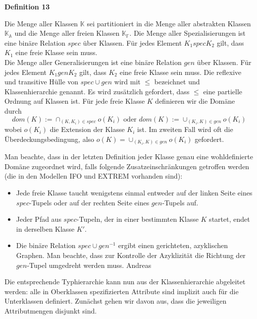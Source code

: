 \begin{itemize}
	\begin{framed}
		\textbf{Definition 13}
	\end{framed}
	
	Man beachte, dass in der letzten Definition jeder Klasse genau eine
	wohldefinierte Domäne zugeordnet wird, falls folgende
	Zusatzeinschränkungen getroffen werden (die in den Modellen IFO
	und EXTREM vorhanden sind):
	
	\begin{itemize}
		\item Jede freie Klasse taucht wenigstens einmal entweder auf der
		linken Seite eines $spec$-Tupels oder auf der rechten Seite eines
		$gen$-Tupels auf.
		\item Jeder Pfad aus $spec$-Tupeln, der in einer bestimmten Klasse $K$
		startet, endet in derselben Klasse $K'$.
		\item Die binäre Relation $spec \cup gen^{-1}$ ergibt einen gerichteten,
		azyklischen Graphen. Man beachte, dass zur Kontrolle der
		Azyklizität die Richtung der $gen$-Tupel umgedreht werden muss.
		Andreas
	\end{itemize}
	
	Die entsprechende Typhierarchie kann nun aus der Klassenhierarchie
	abgeleitet werden: alle in Oberklassen spezifizierten Attribute sind
	implizit auch für die Unterklassen definiert. Zunächst gehen wir davon
	aus, dass die jeweiligen Attributmengen disjunkt sind.
	

\end{itemize}

